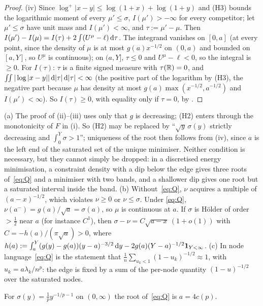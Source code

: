 \begin{proof}
(iv) Since $\log^+|x-y|\le\log(1+x)+\log(1+y)$ and (H3) bounds the logarithmic moment of every $\mu'\le\sigma$,
$I(\mu')>-\infty$ for every competitor; let $\mu'\le\sigma$ have unit mass and $I(\mu')<\infty$, and $\tau:=\mu'-\mu$. Then
$I(\mu')-I(\mu)=I(\tau)+2\int(U^\mu-\ell)\,\mathrm{d}\tau$. The integrand vanishes on $[0,a]$ (at every point, since the density
of $\mu$ is at most $g(a)x^{-1/2}$ on $(0,a)$ and bounded on $[a,Y]$, so $U^\mu$ is continuous); on $(a,Y]$, $\tau\le0$ and
$U^\mu-\ell<0$, so the integral is $\ge0$. For $I(\tau)$: $\tau$ is a finite signed measure with $\tau(\mathbb{R})=0$, and
$\iint|\log|x-y||\,\mathrm{d}|\tau|\,\mathrm{d}|\tau|<\infty$ (the positive part of the logarithm by (H3), the negative part because $\mu$
has density at most $g(a)\max(x^{-1/2},a^{-1/2})$ and $I(\mu')<\infty$). So $I(\tau)\ge0$, with equality only if $\tau=0$,
by \cite[Lemma~3.3]{PaperI}.
\end{proof}

\begin{remark}\label{rem:Q}
(a) The proof of (ii)--(iii) uses only that $g$ is decreasing; (H2) enters through the monotonicity of $F$ in (i). So
(H2) may be replaced by ``$\sqrt y\,\sigma(y)$ strictly decreasing and $\int_0^Y\sigma>1$''; uniqueness of the root then
follows from (iv), since $a$ is the left end of the saturated set of the unique minimiser. Neither condition is necessary,
but they cannot simply be dropped: in a discretised energy minimisation, a constraint density with a dip below the edge gives
three roots of~\eqref{eq:Q} and a minimiser with two bands, and a shallower dip gives one root but a saturated interval
inside the band.
(b) Without~\eqref{eq:Q}, $\nu$ acquires a multiple of $(a-x)^{-1/2}$, which violates $\nu\ge0$ or $\nu\le\sigma$. Under
\eqref{eq:Q}, $\nu(a^-)=g(a)/\sqrt a=\sigma(a)$, so $\mu$ is continuous at $a$. If $\sigma$ is H\"older of order $>\frac12$
near $a$ (for instance $C^1$), then $\sigma-\nu=C\sqrt{a-x}\,(1+o(1))$ with $C=-h(a)/(\pi\sqrt a)>0$, where
$h(a):=\int_a^Y(g(y)-g(a))(y-a)^{-3/2}\,\mathrm{d} y-2g(a)(Y-a)^{-1/2}\mathbf 1_{Y<\infty}$.
(c) In node language~\eqref{eq:Q} is the statement that $\frac1n\sum_{u_k<1}(1-u_k)^{-1/2}\approx1$, with
$u_k=a\lambda_k/n^p$: the edge is fixed by a sum of the per-node quantity $(1-u)^{-1/2}$ over the saturated nodes.
\end{remark}

\begin{corollary}\label{cor:Q1}
For $\sigma(y)=\frac1py^{-1/p-1}$ on $(0,\infty)$ the root of~\eqref{eq:Q} is $a=4c(p)$.
\end{corollary}

